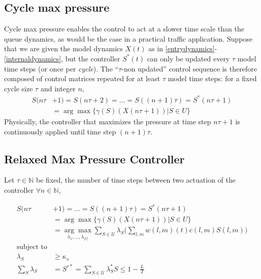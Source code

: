 \subsection*{Cycle max pressure}

Cycle max pressure enables the control to act at a slower time scale than the queue dynamics, as would be the case in a practical traffic application. Suppose that we are given the model dynamics $X(t)$ as in \eqref{entrydynamics}-\eqref{internaldynamics}, but the controller $S^*(t)$ can only be updated every $\tau$ model time steps (or once per \emph{cycle}). The ``$\tau$-non updated'' control sequence is therefore composed of control matrices repeated for at least $\tau$ model time steps: for a fixed cycle size $\tau$ and integer $n$, 
\begin{align} \nonumber
S(n\tau&+1)  = S(n\tau +2) = \ldots = S((n+1)\tau ) = S^*(n\tau +1) \\
&=  \arg\max\{\gamma(S)(X(n\tau +1 )) \vert S \in U\}  
 \label{CYCLE_CONTROLLER}
\end{align}
Physically, the controller that maximizes the pressure at time step $n\tau + 1$ is continuously applied until time step $(n + 1)\tau$.

\subsection*{Relaxed Max Pressure Controller}

Let $\tau \in \mathbb{N}$ be fixed, the number of time steps between two actuation of the controller
$\forall n \in \mathbb{N}$, 

\begin{align} \nonumber
S(n\tau&+1)   = \ldots = S((n+1)\tau ) = S^*(n\tau +1) \\
&=  \arg\max\{\gamma(S)(X(n\tau +1 )) \vert S \in U\}  \\
& =  \underset{\lambda_{1},...,\lambda_{\vert U\vert}}{ \arg \max}  \sum_{S \in \mathcal{U}}\lambda_{S}\Big(\sum_{l,m} w(l,m)(t)c(l,m) S(l,m)\Big)  \\
\nonumber  \text{subject to}\\
\nonumber    \lambda_{S} & \geq \kappa_s\\
 \sum_{S} \lambda_{S} &  = S^{r*} = \displaystyle\sum_{S \in \mathcal{U}}\lambda_{S}^{*}S \leq 1 - \tfrac{L}{T}  \label{distMP_LP} 
\end{align}


